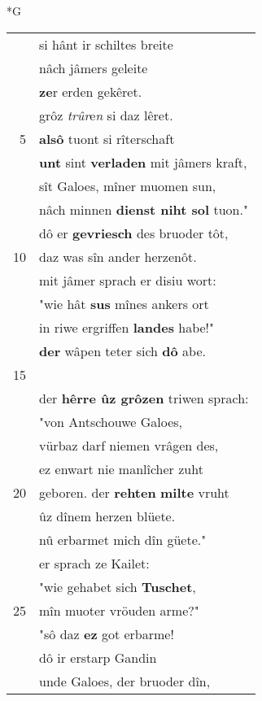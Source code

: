 \documentclass[8pt,a4paper,notitlepage]{article}
\begin{document}
\begin{table}[ht]
\begin{minipage}[t]{0.5\linewidth}
\small
\begin{center}*G
\end{center}
\begin{tabular}{rl}
 & si hânt ir schiltes breite\\ 
 & nâch jâmers geleite\\ 
 & \textbf{ze}r erden gekêret.\\ 
 & grôz \textit{trûr}e\textit{n} si daz lêret.\\ 
5 & \textbf{alsô} tuont si rîterschaft\\ 
 & \textbf{unt} sint \textbf{verladen} mit jâmers kraft,\\ 
 & sît Galoes, mîner muomen sun,\\ 
 & nâch minnen \textbf{dienst niht sol} tuon."\\ 
 & dô er \textbf{gevriesch} des bruoder tôt,\\ 
10 & daz was sîn ander herzenôt.\\ 
 & mit jâmer sprach er disiu wort:\\ 
 & "wie hât \textbf{sus} mînes ankers ort\\ 
 & in riwe ergriffen \textbf{landes} habe!"\\ 
 & \textbf{der} wâpen teter sich \textbf{dô} abe.\\ 
15 & \textbf{\begin{large}G\end{large}rôz} riwe im hertes kumbers jach.\\ 
 & der \textbf{hêrre ûz grôzen} triwen sprach:\\ 
 & "von Antschouwe Galoes,\\ 
 & vürbaz darf niemen vrâgen des,\\ 
 & ez enwart nie manlîcher zuht\\ 
20 & geboren. der \textbf{rehten} \textbf{milte} vruht\\ 
 & ûz dînem herzen blüete.\\ 
 & nû erbarmet mich dîn güete."\\ 
 & er sprach ze Kailet:\\ 
 & "wie gehabet sich \textbf{Tuschet},\\ 
25 & mîn muoter vröuden arme?"\\ 
 & "sô daz \textbf{ez} got erbarme!\\ 
 & dô ir erstarp Gandin\\ 
 & unde Galoes, der bruoder dîn,\\ 

\end{tabular}
\end{minipage}
\end{table}
\end{document}
